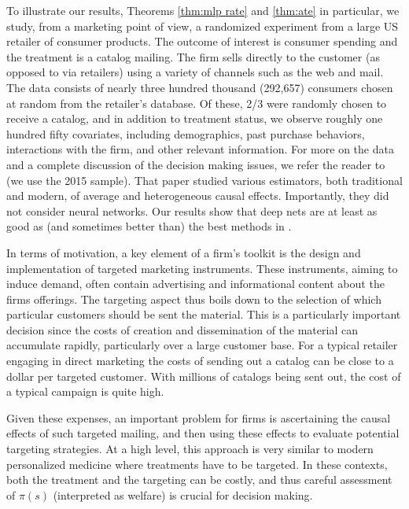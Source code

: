\documentclass[11pt]{article}
\numberwithin{equation}{section}
\theoremstyle{definition}
\begin{document}
To illustrate our results, Theorems \ref{thm:mlp rate} and \ref{thm:ate} in particular, we study, from a marketing point of view, a randomized experiment from a large US retailer of consumer products. The outcome of interest is consumer spending and the treatment is a catalog mailing. The firm sells directly to the customer (as opposed to via retailers) using a variety of channels such as the web and mail. The data consists of nearly three hundred thousand (292,657) consumers chosen at random from the retailer's database. Of these, 2/3 were randomly chosen to receive a catalog, and in addition to treatment status, we observe roughly one hundred fifty covariates, including demographics, past purchase behaviors, interactions with the firm, and other relevant information. For more on the data and a complete discussion of the decision making issues, we refer the reader to \cite{Hitsch-Misra2018_WP} (we use the 2015 sample). That paper studied various estimators, both traditional and modern, of average and heterogeneous causal effects. Importantly, they did not consider neural networks. Our results show that deep nets are at least as good as (and sometimes better than) the best methods in \cite{Hitsch-Misra2018_WP}.



In terms of motivation, a key element of a firm's toolkit is the design and implementation
of targeted marketing instruments. These instruments, aiming to induce demand, often contain advertising and informational content about the firms offerings. 
The targeting aspect thus boils down to the selection of which particular customers should be sent the material. This is a particularly important decision
since the costs of creation and dissemination of the material can accumulate rapidly, particularly over a large customer base. For a typical retailer engaging in direct marketing the costs of sending out a catalog 
can be close to a dollar per targeted customer.
With millions of catalogs being sent out, the cost of a typical campaign is quite high.

Given these expenses, an important problem for firms is ascertaining
the causal effects of such targeted mailing, and then using
these effects to evaluate potential targeting strategies. At a high level, this approach is very similar to modern personalized medicine where
treatments have to be targeted. In these contexts, both the treatment and the targeting can be costly, and thus careful assessment of $\pi(s)$ (interpreted as welfare) is crucial for decision making.
\end{document}
